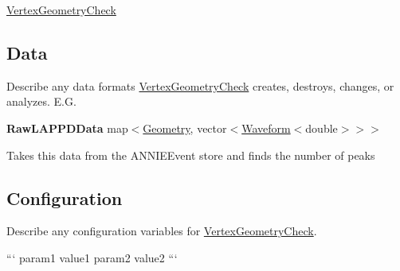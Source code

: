 \hyperlink{classVertexGeometryCheck}{Vertex\-Geometry\-Check}

\subsection*{Data}

Describe any data formats \hyperlink{classVertexGeometryCheck}{Vertex\-Geometry\-Check} creates, destroys, changes, or analyzes. E.\-G.

{\bfseries Raw\-L\-A\-P\-P\-D\-Data} {\ttfamily map$<$\hyperlink{classGeometry}{Geometry}, vector$<$\hyperlink{classWaveform}{Waveform}$<$double$>$$>$$>$}
\begin{DoxyItemize}
\item Takes this data from the {\ttfamily A\-N\-N\-I\-E\-Event} store and finds the number of peaks
\end{DoxyItemize}

\subsection*{Configuration}

Describe any configuration variables for \hyperlink{classVertexGeometryCheck}{Vertex\-Geometry\-Check}.

``` param1 value1 param2 value2 ``` 